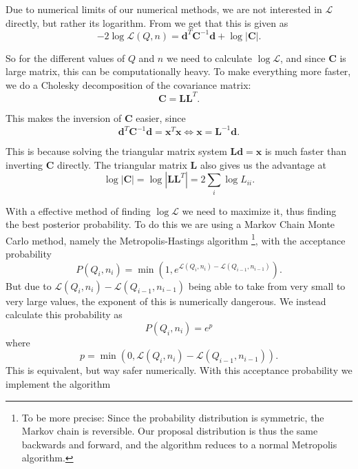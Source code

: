 \documentclass{emulateapj}
\begin{document}
Due to numerical limits of our numerical methods, we are not interested in $\mathcal{L}$ directly, but rather its logarithm. From \cite{HK} we get that this is given as
\begin{equation}
-2\log \mathcal{L}(Q,n) =  \mathbf{d}^T\mathbf{C}^{-1}\mathbf{d} + \log|\mathbf{C}|.
\end{equation}

So for the different values of $Q$ and $n$ we need to calculate $\log \mathcal{L}$, and since $\mathbf{C}$ is large matrix, this can be computationally heavy. To make everything more faster, we do a Cholesky decomposition of the covariance matrix:
\begin{equation}
\mathbf{C} = \mathbf{L}\mathbf{L}^T.
\end{equation} 
 
This makes the inversion of $\mathbf{C}$ easier, since
\begin{equation}
\mathbf{d}^T\mathbf{C}^{-1}\mathbf{d} = \mathbf{x}^T\mathbf{x} \Leftrightarrow \mathbf{x} = \mathbf{L}^{-1}\mathbf{d}.
\end{equation}

This is because solving the triangular matrix system $\mathbf{L}\mathbf{d} = \mathbf{x}$ is much faster than inverting $\mathbf{C}$ directly. The triangular matrix $\mathbf{L}$ also gives us the advantage at
\begin{equation}
\log|\mathbf{C}| = \log |\mathbf{L}\mathbf{L}^T| = 2\sum_i \log L_{ii}.
\end{equation}


With a effective method of finding $\log \mathcal{L}$ we need to maximize it, thus finding the best posterior probability. To do this we are using a Markov Chain Monte Carlo method, namely the Metropolis-Hastings algorithm \citep{ML}\footnote{To be more precise: Since the probability distribution is symmetric, the Markov chain is reversible. Our proposal distribution is thus the same backwards and forward, and the algorithm reduces to a normal Metropolis algorithm.}, with the acceptance probability
\begin{equation}
P(Q_i,n_i) = \min\left(1,e^{\mathcal{L}(Q_{i},n_{i})-\mathcal{L}(Q_{i-1},n_{i-1})}\right).
\end{equation} 
But due to $\mathcal{L}(Q_{i},n_{i})-\mathcal{L}(Q_{i-1},n_{i-1})$ being able to take from very small to very large values, the exponent of this is numerically dangerous. We instead calculate this probability as
\begin{equation}
P(Q_i,n_i) = e^{p}
\label{eq:AccProb}
\end{equation}
where
\begin{equation}
p = \min\left(0,\mathcal{L}(Q_{i},n_{i})-\mathcal{L}(Q_{i-1},n_{i-1})\right).
\label{eq:accProbExp}
\end{equation}
This is equivalent, but way safer numerically. With this acceptance probability we implement the algorithm
\end{document}
